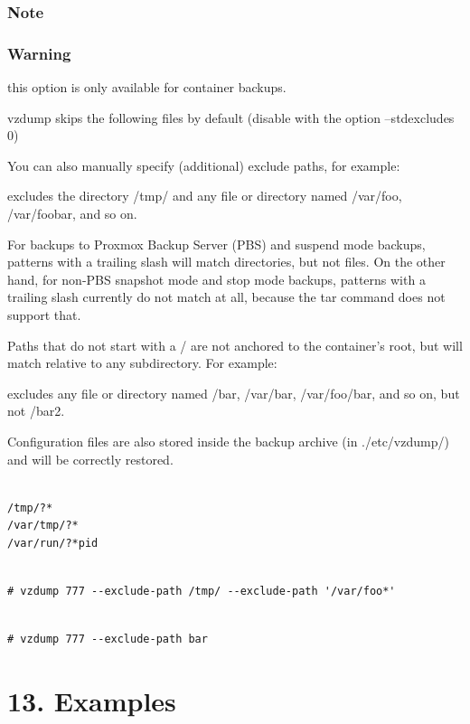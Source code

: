 \subsubsection{Note}

\subsubsection{Warning}

this option is only available for container backups.

vzdump skips the following files by default (disable with the option --stdexcludes 0)

You can also manually specify (additional) exclude paths, for example:

excludes the directory /tmp/ and any file or directory named /var/foo, /var/foobar, and so on.

For backups to Proxmox Backup Server (PBS) and suspend mode backups, patterns with a trailing slash will match directories, but not files. On the other hand, for non-PBS snapshot mode and stop mode backups, patterns with a trailing slash currently do not match at all, because the tar command does not support that.

Paths that do not start with a / are not anchored to the container’s root, but will match relative to any subdirectory. For example:

excludes any file or directory named /bar, /var/bar, /var/foo/bar, and so on, but not /bar2.

Configuration files are also stored inside the backup archive (in ./etc/vzdump/) and will be correctly restored.

\begin{lstlisting}

/tmp/?*
/var/tmp/?*
/var/run/?*pid

\end{lstlisting}

\begin{lstlisting}

# vzdump 777 --exclude-path /tmp/ --exclude-path '/var/foo*'

\end{lstlisting}

\begin{lstlisting}

# vzdump 777 --exclude-path bar

\end{lstlisting}


\section{13. Examples}

